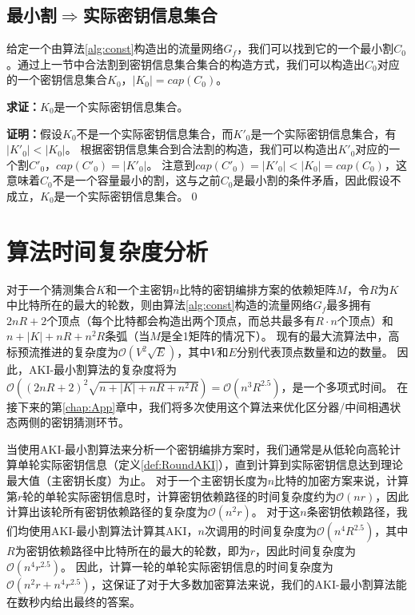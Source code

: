 \subsection{最小割$\Rightarrow$实际密钥信息集合}
给定一个由算法\ref{alg:const}构造出的流量网络$G_f$，我们可以找到它的一个最小割$C_0$。通过上一节中合法割到密钥信息集合集合的构造方式，我们可以构造出$C_0$对应的一个密钥信息集合$K_0$，$|K_0|=cap(C_0)$。

\noindent
\textbf{求证：}$K_0$是一个实际密钥信息集合。

\noindent
\textbf{证明：}假设$K_0$不是一个实际密钥信息集合，而$K'_0$是一个实际密钥信息集合，有$|K'_0|<|K_0|$。
根据密钥信息集合到合法割的构造，我们可以构造出$K'_0$对应的一个割$C'_0$，$cap(C'_0)=|K'_0|$。
注意到$cap(C'_0)=|K'_0|<|K_0|=cap(C_0)$，这意味着$C_0$不是一个容量最小的割，这与之前$C_0$是最小割的条件矛盾，因此假设不成立，$K_0$是一个实际密钥信息集合。\qed

\section{算法时间复杂度分析}
对于一个猜测集合$K$和一个主密钥$n$比特的密钥编排方案的依赖矩阵$M$，令$R$为$K$中比特所在的最大的轮数，则由算法\ref{alg:const}构造的流量网络$G_f$最多拥有$2nR+2$个顶点（每个比特都会构造出两个顶点，而总共最多有$R\cdot n$个顶点）和$n+|K|+nR+n^2R$条弧（当$M$是全1矩阵的情况下）。
现有的最大流算法中，高标预流推进的复杂度为$\mathcal{O}(V^2\sqrt{E})$，其中$V$和$E$分别代表顶点数量和边的数量。
因此，AKI-最小割算法的复杂度将为$\mathcal{O}((2nR+2)^2\sqrt{n+|K|+nR+n^2R})=\mathcal{O}(n^3R^{2.5})$，是一个多项式时间。
在接下来的第\ref{chap:App}章中，我们将多次使用这个算法来优化区分器/中间相遇状态两侧的密钥猜测环节。

当使用AKI-最小割算法来分析一个密钥编排方案时，我们通常是从低轮向高轮计算单轮实际密钥信息（定义\ref{def:RoundAKI}），直到计算到实际密钥信息达到理论最大值（主密钥长度）为止。
对于一个主密钥长度为$n$比特的加密方案来说，计算第$r$轮的单轮实际密钥信息时，计算密钥依赖路径的时间复杂度约为$\mathcal{O}(nr)$，因此计算出该轮所有密钥依赖路径的复杂度为$\mathcal{O}(n^2r)$。
对于这$n$条密钥依赖路径，我们均使用AKI-最小割算法计算其AKI，$n$次调用的时间复杂度为$\mathcal{O}(n^4R^{2.5})$，其中$R$为密钥依赖路径中比特所在的最大的轮数，即为$r$，因此时间复杂度为$\mathcal{O}(n^4r^{2.5})$。
因此，计算一轮的单轮实际密钥信息的时间复杂度为$\mathcal{O}(n^2r+n^4r^{2.5})$，这保证了对于大多数加密算法来说，我们的AKI-最小割算法能在数秒内给出最终的答案。

